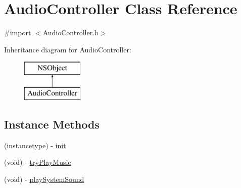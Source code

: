\hypertarget{interface_audio_controller}{\section{Audio\+Controller Class Reference}
\label{interface_audio_controller}
}


{\ttfamily \#import $<$Audio\+Controller.\+h$>$}

Inheritance diagram for Audio\+Controller\+:\begin{figure}[H]
\begin{center}
\leavevmode
\includegraphics[height=2.000000cm]{d1/d60/interface_audio_controller}
\end{center}
\end{figure}
\subsection*{Instance Methods}
\begin{DoxyCompactItemize}
\item 
(instancetype) -\/ \hyperlink{interface_audio_controller_a7013b8ea0aded4b85246b4aac3f2aca3}{init}
\item 
(void) -\/ \hyperlink{interface_audio_controller_ad106c77329720c80a78f51b33961bfc2}{try\+Play\+Music}
\item 
(void) -\/ \hyperlink{interface_audio_controller_ab43bef477818c79902266b4064526c01}{play\+System\+Sound}
\end{DoxyCompactItemize}



